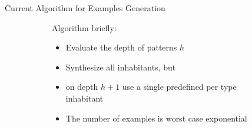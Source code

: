 \documentclass[aspectratio=169
  , xcolor={svgnames}
  , hyperref={ colorlinks,citecolor=Blue
             , linkcolor=DarkRed,urlcolor=DarkBlue}
  , russian
  ]{beamer}
\begin{document}
\begin{frame}{Current Algorithm for Examples Generation}
\begin{figure}
\begin{subfigure}[b]{0.75\linewidth}
Algorithm briefly:
\begin{itemize}
\item Evaluate the depth of patterns $h$
\item Synthesize all inhabitants, but
\item on depth $h+1$ use a single predefined per type inhabitant 
\end{itemize}
\vspace{1cm}

\begin{itemize}
\item[\faBad] The number of examples is  worst case exponential
\end{itemize}
\end{subfigure}
\hspace{.5cm}
\begin{subfigure}[b]{0.45\linewidth}

\end{subfigure}
\end{figure}

\end{frame}
\end{document}
